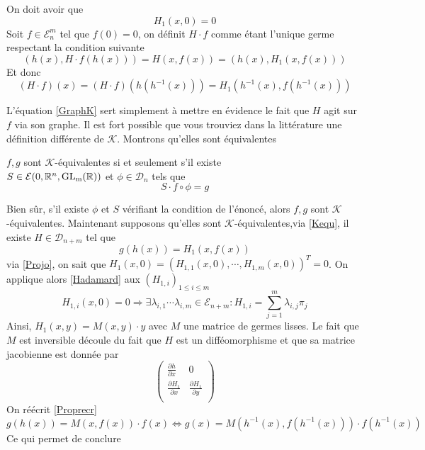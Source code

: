 \documentclass[memoire.tex]{subfiles}
\begin{document}
On doit avoir que 
\begin{equation}\label{Projo}
    H_1(x,0)=0
\end{equation}
Soit $f\in \mathcal{E}^m_n$ tel que $f(0)=0$, on définit $H\cdot f$ comme étant l'unique germe respectant la condition suivante 
\begin{equation}\label{GraphK}
    (h(x),H\cdot f(h(x)))=H(x,f(x))=(h(x),H_1(x,f(x)))
\end{equation}
Et donc 
\begin{equation}\label{Kequ}
    (H\cdot f)(x)=(H\cdot f)(h (h^{-1}(x)))=H_1(h^{-1}(x),f(h^{-1}(x))) 
\end{equation}


L'équation \ref{GraphK} sert simplement à mettre en évidence le fait que $H$ agit sur $f$ via son graphe. Il est fort possible que vous trouviez dans la littérature une définition différente  de $\mathcal{K}$. Montrons qu'elles sont équivalentes
\begin{proposition}\label{MATRIXform}
    $f,g$ sont $\mathcal{K}
    $-équivalentes si et 
    seulement s'il existe 
    \\$S\in\mathcal{E}(0,\mathbb{R}^n,
    \operatorname{GL_{m}(\mathbb{R})}) 
    $  et $\phi\in\mathcal{D}_
    {n}$  tels que 
    \begin{equation*}
        S\cdot f\circ \phi=  g
    \end{equation*}
\end{proposition} 
\begin{preuve}
    Bien sûr, s'il existe $\phi$ et $S$ 
    vérifiant la condition de l'énoncé, 
    alors $f,g$ sont $\mathcal{K}
    $-équivalentes. 
    Maintenant supposons qu'elles sont 
    $\mathcal{K}$-équivalentes,via \ref{Kequ}, il existe 
    $H\in\mathcal{D}_{n+m}$ tel que 
    \begin{equation}\label{Proprecr}
        g(h(x))=H_1(x,f(x))
    \end{equation}
    via \ref{Projo}, on sait que 
    $H_1(x,0)=(H_{1,1}(x,0),\cdots,H_{1,m}(x,0))^T=0$. On applique alors 
    \ref{Hadamard} aux $(H_{1,i})_{1\leq i \leq m}$
    \begin{equation*}
        H_{1,i}(x,0)=0\Rightarrow \exists \lambda_{i,1}\cdots \lambda_{i,m}\in\mathcal{E}_{n+m} :H_{1,i}=\sum_{j=1}^m \lambda_{i,j}\pi_j 
    \end{equation*}
    Ainsi, $H_1(x,y)=M(x,y)\cdot y$ avec $M$ une matrice de germes lisses. Le fait que $M$ est inversible découle du fait que $H$ est un difféomorphisme et que sa matrice jacobienne est donnée par 
    \begin{equation*}
        \begin{pmatrix}
        \frac{\partial h}{\partial x} & 0 \\
        \frac{\partial H_1}{\partial x} & \frac{\partial H_1}{\partial y}  \\
        \end{pmatrix} 
    \end{equation*}
    On réécrit \ref{Proprecr} 
    \begin{equation*}
        g(h(x))=M(x,f(x))\cdot f(x)\Leftrightarrow g(x)=M(h^{-1}(x),f(h^{-1}(x)))\cdot f(h^{-1}(x))
    \end{equation*}
    Ce qui permet de conclure
\end{preuve}
\end{document}

